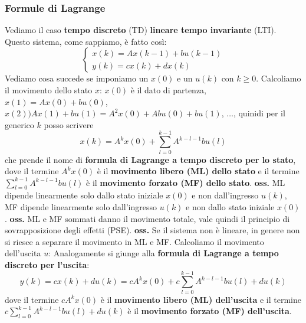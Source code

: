 \subsubsection*{Formule di Lagrange}
Vediamo il caso \textbf{tempo discreto} (TD) \textbf{lineare tempo invariante} (LTI). Questo sistema, come sappiamo, è fatto così:
\[
    \begin{cases}
        x(k) = A x(k-1) + b u(k-1)\\
        y(k) = cx(k) + dx(k)
    \end{cases}
\]
Vediamo cosa succede se imponiamo un $x(0)$ e un $u(k)$ con $k\geq 0$.\newline
\newline
Calcoliamo il movimento dello stato $x$:\newline
$x(0)$ è il dato di partenza, \newline
$x(1) = Ax(0) + bu(0)$, \newline
$x(2) ) A x(1) + bu(1) = A^2 x(0) + Abu(0) + bu(1)$,\newline
$\dots$,\newline
quinidi per il generico $k$ posso scrivere
\[
    x(k) = A^kx(0) + \sum_{l=0}^{k-1}A^{k-l-1}bu(l)
\]
che prende il nome di \textbf{formula di Lagrange a tempo discreto per lo stato}, dove il termine $A^k x(0)$ è il \textbf{movimento libero (ML) dello stato} e il termine $\sum_{l=0}^{k-1}A^{k-l-1}bu(l)$ è il \textbf{movimento forzato (MF) dello stato}.\newline
\textbf{oss.}  ML dipende linearmente solo dallo stato iniziale $x(0)$ e non dall'ingresso $u(k)$, MF dipende linearmente solo dall'ingresso $u(k)$ e non dallo stato iniziale $x(0)$.\newline
\textbf{oss.}  ML e MF sommati danno il movimento totale, vale quindi il principio di sovrapposizione degli effetti (PSE).\newline
\textbf{oss.} Se il sistema non è lineare, in genere non si riesce a separare il movimento in ML e MF. \newline
\newline
Calcoliamo il movimento dell'uscita $u$:\newline
Analogamente si giunge alla \textbf{formula di Lagrange a tempo discreto per l'uscita}:
\[
    y(k) = cx(k) + du(k) = c A^k x(0) + c \sum_{l=0}^{k-1}A^{k-l-1}bu(l) + du(k)
\]
dove il termine $c A^k x(0)$ è il \textbf{movimento libero (ML) dell'uscita} e il termine $c \sum_{l=0}^{k-1}A^{k-l-1}bu(l) + du(k)$ è il \textbf{movimento forzato (MF) dell'uscita}.\newline
